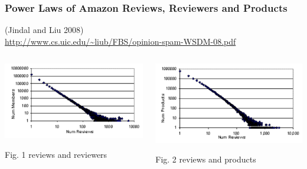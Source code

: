\documentclass[t]{beamer}
\begin{document}
\begin{frame} \frametitle{Power Laws of Amazon Reviews, Reviewers and Products} %

(Jindal and Liu 2008) \\
\url{http://www.cs.uic.edu/~liub/FBS/opinion-spam-WSDM-08.pdf}


\begin{columns}[T]

\begin{column}{0.5\textwidth}

\begin{center}
     \includegraphics[width=\textwidth]{amazon-reviews-members}
\end{center}
Fig. 1 reviews and reviewers

\end{column}

\begin{column}{0.5\textwidth}

\begin{center}
     \includegraphics[width=\textwidth]{amazon-reviews-products}
\end{center}
Fig. 2 reviews and products

\end{column}
\end{columns}




\end{frame}
\end{document}
